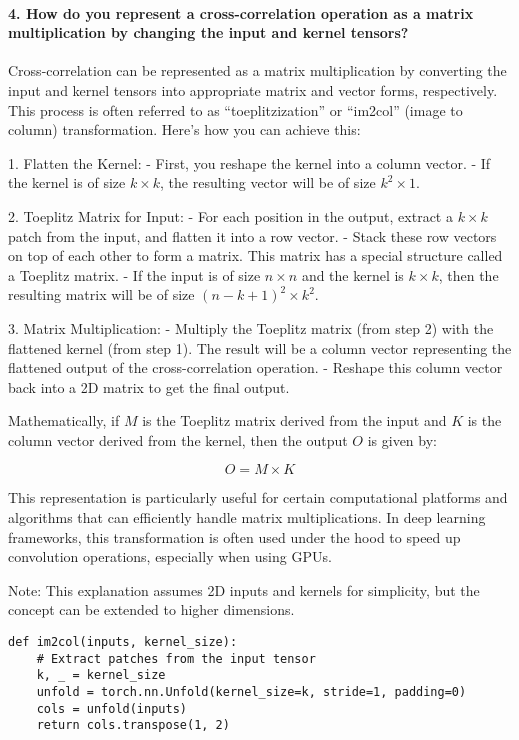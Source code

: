 \paragraph{4. How do you represent a cross-correlation operation as a matrix multiplication by changing the input and kernel tensors?}

Cross-correlation can be represented as a matrix multiplication by converting the input and kernel tensors into appropriate matrix and vector forms, respectively.
This process is often referred to as ``toeplitzization'' or ``im2col'' (image to column) transformation. Here's how you can achieve this:

1. Flatten the Kernel:
- First, you reshape the kernel into a column vector.
- If the kernel is of size \( k \times k \), the resulting vector will be of size \( k^2 \times 1 \).

2. Toeplitz Matrix for Input:
- For each position in the output, extract a \( k \times k \) patch from the input, and flatten it into a row vector.
- Stack these row vectors on top of each other to form a matrix. This matrix has a special structure called a Toeplitz matrix.
- If the input is of size \( n \times n \) and the kernel is \( k \times k \), then the resulting matrix will be of size \( \left(n-k+1\right)^2   \times k^2 \).

3. Matrix Multiplication:
- Multiply the Toeplitz matrix (from step 2) with the flattened kernel (from step 1). The result will be a column vector representing the flattened output of the cross-correlation operation.
- Reshape this column vector back into a 2D matrix to get the final output.

Mathematically, if \( M \) is the Toeplitz matrix derived from the input and \( K \) is the column vector derived from the kernel, then the output \( O \) is given by:

\[ O = M \times K \]

This representation is particularly useful for certain computational platforms and algorithms that can efficiently handle matrix multiplications.
In deep learning frameworks, this transformation is often used under the hood to speed up convolution operations, especially when using GPUs.

Note: This explanation assumes 2D inputs and kernels for simplicity, but the concept can be extended to higher dimensions.

\begin{verbatim}
def im2col(inputs, kernel_size):
    # Extract patches from the input tensor
    k, _ = kernel_size
    unfold = torch.nn.Unfold(kernel_size=k, stride=1, padding=0)
    cols = unfold(inputs)
    return cols.transpose(1, 2)
\end{verbatim}

